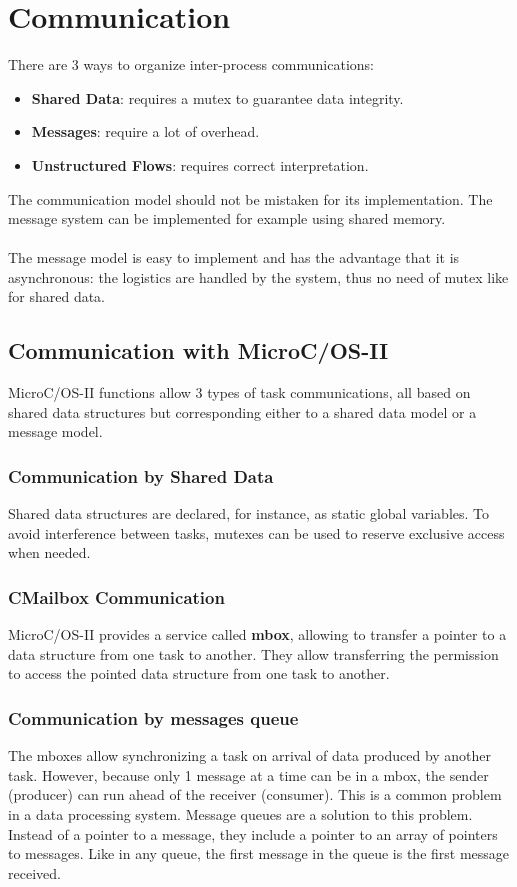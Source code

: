 \documentclass[../main.tex]{subfiles}
\begin{document}
\section{Communication}
There are 3 ways to organize inter-process communications:
\begin{itemize}
	\item \textbf{Shared Data}: requires a mutex to guarantee data integrity.
	\item \textbf{Messages}: require a lot of overhead.
	\item \textbf{Unstructured Flows}: requires correct interpretation.
\end{itemize}
The communication model should not be mistaken for its implementation. The message system can be implemented for example using shared memory.
\\\\
The message model is easy to implement and has the advantage that it is asynchronous: the logistics are handled by the system, thus no need of mutex like for shared data.

\subsection{Communication with MicroC/OS-II}
MicroC/OS-II functions allow 3 types of  task communications, all based on shared data structures but corresponding either to a shared data model or a message model.

\subsubsection{Communication by Shared Data}
Shared data structures are declared, for instance, as static global variables. To avoid interference between tasks, mutexes can be used to reserve exclusive access when needed.

\subsubsection{CMailbox Communication}
MicroC/OS-II provides a service called \textbf{mbox}, allowing to transfer a pointer to a data structure from one task to another. They allow transferring the permission to access  the pointed data structure from one task to another.


\subsubsection{Communication by messages queue}
The mboxes allow synchronizing a task on arrival of data produced by another task. However, because only 1 message at a time can be in a mbox, the sender (producer) can run ahead of the receiver (consumer). This is a common problem in a data processing system.
Message queues are a solution to this problem. Instead of a pointer to a message, they include a pointer to an array of pointers to messages. Like in any queue, the first message in the queue is the first message received.
\end{document}
